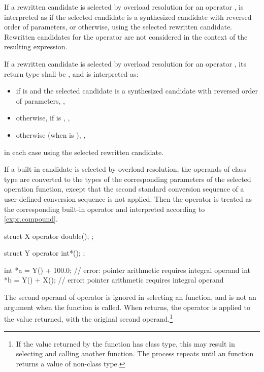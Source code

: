 \pnum
If a rewritten  candidate
is selected by overload resolution
for an operator ,
is interpreted as
if the selected candidate is a synthesized candidate
with reversed order of parameters,
or  otherwise,
using the selected rewritten  candidate.
Rewritten candidates for the operator 
are not considered in the context of the resulting expression.

\pnum
If a rewritten  candidate
is selected by overload resolution
for an operator ,
its return type shall be \cv{} , and
 is interpreted as:
\begin{itemize}
\item
if  is \tcode{!=}
and the selected candidate is a synthesized candidate
with reversed order of parameters,
,
\item
otherwise, if  is \tcode{!=},
,
\item
otherwise (when  is \tcode{==}),
,
\end{itemize}
in each case using the selected rewritten  candidate.

\pnum
If a built-in candidate is selected by overload resolution, the
operands of class type are converted to the types of the corresponding parameters
of the selected operation function, except that the second standard conversion
sequence of a user-defined conversion sequence is not applied.
Then the operator is treated as the corresponding
built-in operator and interpreted according to \ref{expr.compound}.
\begin{example}
\begin{codeblock}
struct X {
  operator double();
};

struct Y {
  operator int*();
};

int *a = Y() + 100.0;           // error: pointer arithmetic requires integral operand
int *b = Y() + X();             // error: pointer arithmetic requires integral operand
\end{codeblock}
\end{example}

\pnum
The second operand of operator
\tcode{->}
is ignored in selecting an
function, and is not an argument when the
function is called.
When
returns, the operator
\tcode{->}
is applied to the value returned, with the original second
operand.\footnote{If the value returned by the
function has class type, this may result in selecting and calling another
function.
The process repeats until an
function returns a value of non-class type.}

